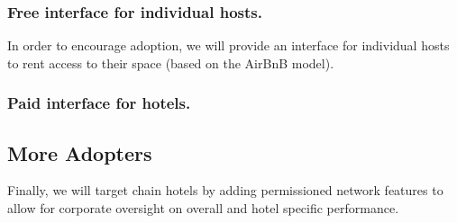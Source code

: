 \documentclass{article}
\begin{document}
\subsubsection*{Free interface for individual hosts.}
In order to encourage adoption, we will provide an interface for individual hosts to rent access to their space (based on the AirBnB model).  

\subsubsection*{Paid interface for hotels.}


\subsection{More Adopters}
Finally, we will target chain hotels by adding permissioned network features to allow for corporate oversight on overall and hotel specific performance.
\end{document}
